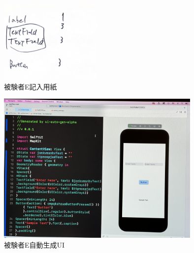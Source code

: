 \begin{figure}[htbp]
  \begin{minipage}{\hsize}
    \begin{center}
       \includegraphics[width=50mm]{img/usertest_viewstructure_5.png}
    \end{center}
    \caption{被験者E記入用紙}
    \label{fig:usertest_viewstructure_5}
  \end{minipage}
\end{figure}

\begin{figure}[htbp]
  \begin{minipage}{\hsize}
    \begin{center}
       \includegraphics[width=100mm]{img/usertest_autogen_5-1.jpeg}
    \end{center}
    \caption{被験者E自動生成UI}
    \label{fig:usertest_autogen_5-1}
  \end{minipage}
\end{figure}

